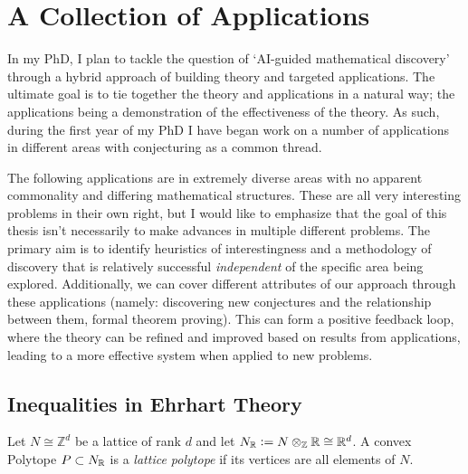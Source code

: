 \chapter{A Collection of Applications}
\label{chap:applications}
In my PhD, I plan to tackle the question of `AI-guided mathematical discovery' through a hybrid approach of building theory and targeted applications. The ultimate goal is to tie together the theory and applications in a natural way; the applications being a demonstration of the effectiveness of the theory. As such, during the first year of my PhD I have began work on a number of
applications in different areas with conjecturing as a common thread.
\par
The following applications are in extremely diverse areas with no apparent commonality and differing mathematical structures. These are all very interesting problems in their own right, but I would like to emphasize that the goal of this thesis isn't necessarily to make advances in multiple different problems. The primary aim is to identify heuristics of interestingness and a methodology of discovery that is relatively successful \textit{independent} of the specific area being explored. Additionally, we can cover different attributes of our approach through these applications (namely: discovering new conjectures and the relationship between them, formal theorem proving).
This can form a positive feedback loop, where the theory can be refined and improved based on results from applications, leading to a more effective system when applied to new problems.

\section{Inequalities in Ehrhart Theory}
\label{sec:ehrhart}
\begin{definition}
    Let $N\cong\mathbb{Z}^d$ be a lattice of rank $d$ and let $N_{\mathbb{R}} := N\otimes_{\mathbb{Z}}\mathbb{R}\cong\mathbb{R}^d$. A convex Polytope $P\subset N_{\mathbb{R}}$ is a \textit{lattice polytope} if its vertices are all elements of $N$.
\end{definition}

